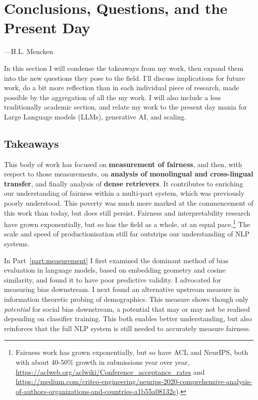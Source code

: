 \chapter{Conclusions, Questions, and the Present Day}\label{chapter:conclusion}

  —H.L. Mencken

In this section I will condense the takeaways from my work, then expand them into the new questions they pose to the field. I'll discuss implications for future work, do a bit more reflection than in each individual piece of research, made possible by the aggregation of all the my work. I will also include a less traditionally academic section, and relate my work to the present day mania for Large Language models (LLMs), generative AI, and scaling.

\section{Takeaways}
This body of work has focused on \textbf{measurement of fairness}, and then, with respect to those measurements, on \textbf{analysis of monolingual and cross-lingual transfer}, and finally analysis of \textbf{dense retrievers}. It contributes to enriching our understanding of fairness within a multi-part system, which was previously poorly understood. This poverty was much more marked at the commencement of this work than today, but does still persist. Fairness and interpretability research have grown exponentially, but so has the field as a whole, at an equal pace.\footnote{Fairness work has grown exponentially, but so have ACL and NeurIPS, both with about 40-50\% growth in submissions year over year, \url{https://aclweb.org/aclwiki/Conference_acceptance_rates} and \url{https://medium.com/criteo-engineering/neurips-2020-comprehensive-analysis-of-authors-organizations-and-countries-a1b55a08132e}).} The scale and speed of productionisation still far outstrips our understanding of NLP systems. 

In Part~\ref{part:measurement} I first examined the dominant method of bias evaluation in language models, based on embedding geometry and cosine similarity, and found it to have poor predictive validity. I advocated for measuring bias downstream. 
I next found an alternative upstream measure in information theoretic probing of demographics. This measure shows though only \textit{potential} for social bias downstream, a potential that may or may not be realised depending on classifier training. This both enables better understanding, but also reinforces that the full NLP system is still needed to accurately measure fairness.

